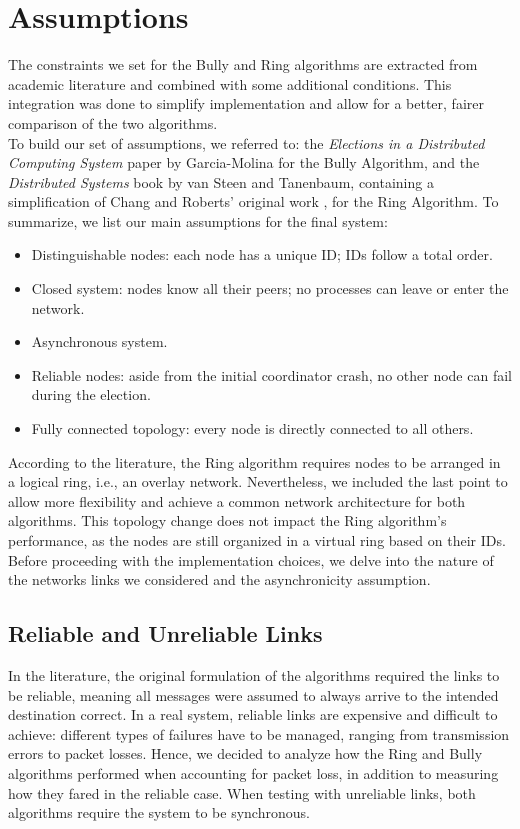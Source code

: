 \documentclass[10pt,journal,compsoc]{IEEEtran}
\begin{document}
\section{Assumptions}
\label{sec:assumptions}
The constraints we set for the Bully and Ring algorithms are extracted from
academic literature and combined with some additional conditions. This
integration was done to simplify implementation and allow for a better, fairer
comparison of the two algorithms. 
\\To build our set of assumptions, we referred to: the \emph{Elections in a
Distributed Computing System} paper by Garcia-Molina\cite{paper:bully} for the
Bully Algorithm, and the \emph{Distributed Systems} book by van Steen and
Tanenbaum\cite{book:ds}, containing a simplification of Chang and Roberts'
original work \cite{paper:ring}, for the Ring Algorithm. To summarize, we list
our main assumptions for the final system:
\begin{itemize}
    \item Distinguishable nodes: each node has a unique ID; IDs follow a total
    order.
    \item Closed system: nodes know all their peers; no processes can leave or
    enter the network.
    \item Asynchronous system.
    \item Reliable nodes: aside from the initial coordinator crash, no other
    node can fail during the election.
    \item Fully connected topology: every node is directly connected to all
    others.
\end{itemize}
According to the literature, the Ring algorithm requires nodes to be arranged
in a logical ring, i.e., an overlay network. Nevertheless, we included the last
point to allow more flexibility and achieve a common network architecture for
both algorithms. This topology change does not impact the Ring algorithm's
performance, as the nodes are still organized in a virtual ring based on their
IDs.
\\Before proceeding with the implementation choices, we delve into the nature of
the networks links we considered and the asynchronicity assumption.
\subsection{Reliable and Unreliable Links}
\label{sec:unreliable}
In the literature, the original formulation of the algorithms required the links
to be reliable, meaning all messages were assumed to always arrive to the
intended destination correct.
In a real system, reliable links are expensive and difficult to achieve:
different types of failures have to be managed, ranging from transmission errors
to packet losses. Hence, we decided to analyze how the Ring and Bully algorithms
performed when accounting for packet loss, in addition to measuring how they
fared in the reliable case. When testing with unreliable links, both algorithms
require the system to be synchronous. 
\end{document}
